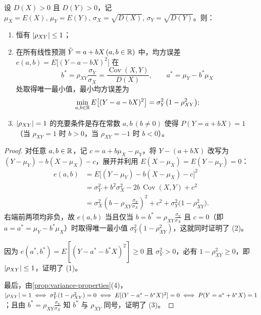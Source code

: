 \begin{theorem}[相关系数的有界性与最佳线性预测]
\label{thm:correlation-bound}
设 $D(X)>0$ 且 $D(Y)>0$，记 $\mu_X=E(X),\,\mu_Y=E(Y),\,\sigma_X=\sqrt{D(X)},\,\sigma_Y=\sqrt{D(Y)}$。则：
\begin{enumerate}
  \item 恒有 $\lvert\rho_{XY}\rvert\le 1$；
  \item 在所有线性预测 $\hat{Y}=a+bX\,(a,b\in\mathbb{R})$ 中，均方误差 $e(a,b)=E\bigl[(Y-a-bX)^2\bigr]$ 在
  \begin{equation}
    b^*=\rho_{XY}\frac{\sigma_Y}{\sigma_X}=\frac{\operatorname{Cov}(X,Y)}{D(X)},\qquad
    a^*=\mu_Y-b^*\mu_X
    \label{eq:best-linear-pred}
  \end{equation}
  处取得唯一最小值，最小均方误差为
  \begin{equation}
    \min_{a,b\in\mathbb{R}}E\bigl[(Y-a-bX)^2\bigr]=\sigma_Y^2\bigl(1-\rho_{XY}^2\bigr);
    \label{eq:min-linear-mse}
  \end{equation}
  \item $\lvert\rho_{XY}\rvert=1$ 的充要条件是存在常数 $a,b\,(b\ne 0)$ 使得 $P(Y=a+bX)=1$（当 $\rho_{XY}=1$ 时 $b>0$，当 $\rho_{XY}=-1$ 时 $b<0$）。
\end{enumerate}
\end{theorem}
\begin{proof}
对任意 $a,b\in\mathbb{R}$，记 $c=a+b\mu_X-\mu_Y$，将 $Y-(a+bX)$ 改写为 $(Y-\mu_Y)-b(X-\mu_X)-c$，展开并利用 $E(X-\mu_X)=E(Y-\mu_Y)=0$：
\[
\begin{aligned}
  e(a,b)&=E\bigl[(Y-\mu_Y)-b(X-\mu_X)-c\bigr]^2\\
  &=\sigma_Y^2+b^2\sigma_X^2-2b\,\operatorname{Cov}(X,Y)+c^2\\
  &=\sigma_X^2\left(b-\rho_{XY}\frac{\sigma_Y}{\sigma_X}\right)^2+c^2+\sigma_Y^2\bigl(1-\rho_{XY}^2\bigr).
\end{aligned}
\]
右端前两项均非负，故 $e(a,b)$ 当且仅当 $b=b^*=\rho_{XY}\frac{\sigma_Y}{\sigma_X}$ 且 $c=0$（即 $a=a^*=\mu_Y-b^*\mu_X$）时取得唯一最小值 $\sigma_Y^2(1-\rho_{XY}^2)$，这就同时证明了 (2)。

因为 $e(a^*,b^*)=E[(Y-a^*-b^*X)^2]\ge 0$ 且 $\sigma_Y^2>0$，必有 $1-\rho_{XY}^2\ge 0$，即 $\lvert\rho_{XY}\rvert\le 1$，证明了 (1)。

最后，由\cref{prop:variance-properties}(4)，$\lvert\rho_{XY}\rvert=1\iff\sigma_Y^2(1-\rho_{XY}^2)=0\iff E[(Y-a^*-b^*X)^2]=0\iff P(Y=a^*+b^*X)=1$；且由 $b^*=\rho_{XY}\frac{\sigma_Y}{\sigma_X}$ 知 $b^*$ 与 $\rho_{XY}$ 同号，证明了 (3)。
\end{proof}

